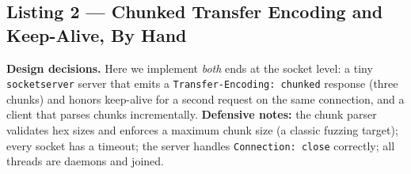 \subsection{Listing 2 --- Chunked Transfer Encoding and Keep-Alive, By Hand}

\textbf{Design decisions.} Here we implement \emph{both} ends at the socket level: a tiny \texttt{socketserver} server that emits a \texttt{Transfer-Encoding: chunked} response (three chunks) and honors keep-alive for a second request on the same connection, and a client that parses chunks incrementally. \textbf{Defensive notes:} the chunk parser validates hex sizes and enforces a maximum chunk size (a classic fuzzing target); every socket has a timeout; the server handles \texttt{Connection: close} correctly; all threads are daemons and joined.

